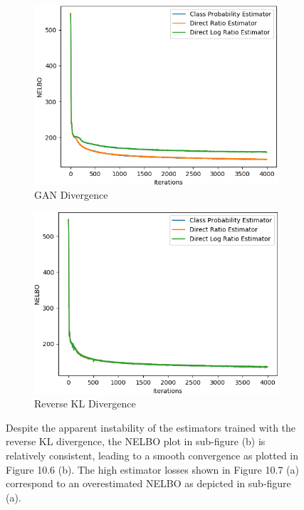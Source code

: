 \documentclass[honours,12pt]{unswthesis}
\numberwithin{equation}{section}
\theoremstyle{definition}
\begin{document}
\begin{figure}[h!]
\centering
\begin{subfigure}{0.49\textwidth}
\includegraphics[width=\linewidth]{part3nelbos/PCADVvsPCADVexpvsPCADVgudlog.png}
\caption{GAN Divergence}
\end{subfigure}
\begin{subfigure}{0.49\textwidth}
\includegraphics[width=\linewidth]{part3nelbos/PCKLDvsPCKLexpvsPCKLgudlog.png}
\caption{Reverse KL Divergence}
\end{subfigure}
\caption{\small Despite the apparent instability of the estimators trained with the reverse KL divergence, the NELBO plot in sub-figure (b) is relatively consistent, leading to a smooth convergence as plotted in Figure 10.6 (b). The high estimator losses shown in Figure 10.7 (a) correspond to an overestimated NELBO as depicted in sub-figure (a).}
\end{figure}
\end{document}
